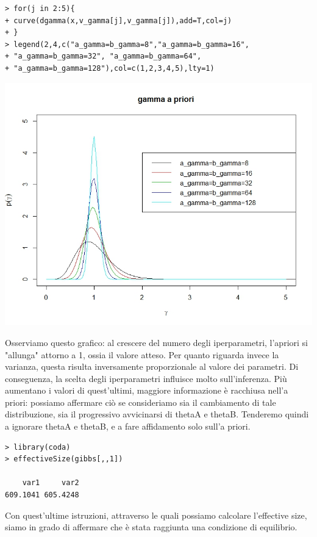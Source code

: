 \begin{enumerate}
\begin{verbatim}
> for(j in 2:5){
+ curve(dgamma(x,v_gamma[j],v_gamma[j]),add=T,col=j)
+ }
> legend(2,4,c("a_gamma=b_gamma=8","a_gamma=b_gamma=16",
+ "a_gamma=b_gamma=32", "a_gamma=b_gamma=64",
+ "a_gamma=b_gamma=128"),col=c(1,2,3,4,5),lty=1)
\end{verbatim}

\begin{center}
\includegraphics[scale=0.5]{img/esercizio6-01-grafo2.jpeg}
\end{center}

Osserviamo questo grafico: al crescere del numero degli iperparametri, l'apriori si "allunga" attorno a 1,
ossia il valore atteso.
Per quanto riguarda invece la varianza, questa risulta inversamente proporzionale al valore dei parametri.
Di conseguenza, la scelta degli iperparametri influisce molto sull'inferenza.
Più aumentano i valori di quest'ultimi, maggiore informazione è racchiusa nell'a priori: possiamo affermare ciò se consideriamo sia il cambiamento di tale distribuzione, sia il progressivo avvicinarsi di thetaA e thetaB.
Tenderemo quindi a ignorare thetaA e thetaB, e a fare affidamento solo sull'a priori.

\begin{verbatim}
> library(coda)
> effectiveSize(gibbs[,,1])

    var1     var2 
609.1041 605.4248 
\end{verbatim}

Con quest'ultime istruzioni, attraverso le quali possiamo calcolare l'effective size, siamo in grado di affermare che è stata raggiunta una condizione di equilibrio.


\end{enumerate}